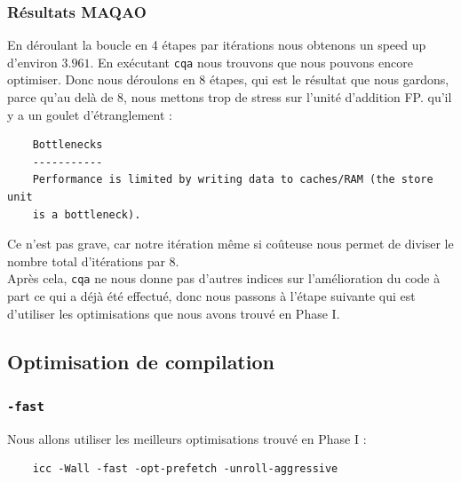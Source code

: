 \documentclass{report}
\begin{document}
  \subsubsection{Résultats MAQAO}
  En déroulant la boucle en 4 étapes par itérations nous obtenons un speed up d'environ $3.961$.
  En exécutant \texttt{cqa} nous trouvons que nous pouvons encore optimiser. Donc nous déroulons
  en 8 étapes, qui est le résultat que nous gardons, parce qu'au delà de 8, nous mettons trop de
  stress sur l'unité d'addition FP.
   qu'il y a un goulet d'étranglement :
  \begin{verbatim}
    Bottlenecks
    -----------
    Performance is limited by writing data to caches/RAM (the store unit
    is a bottleneck).
  \end{verbatim}
  Ce n'est pas grave, car notre itération même si coûteuse nous permet de diviser le nombre
  total d'itérations par 8.\\
  Après cela, \texttt{cqa} ne nous donne pas d'autres indices sur l'amélioration du code à part ce
  qui a déjà été effectué, donc nous passons à l'étape suivante qui est d'utiliser les optimisations
  que nous avons trouvé en Phase I.

  \subsection{Optimisation de compilation}
  \subsubsection{\texttt{-fast}}
  Nous allons utiliser les meilleurs optimisations trouvé en Phase I :
  \begin{verbatim}
    icc -Wall -fast -opt-prefetch -unroll-aggressive
  \end{verbatim}
\end{document}
